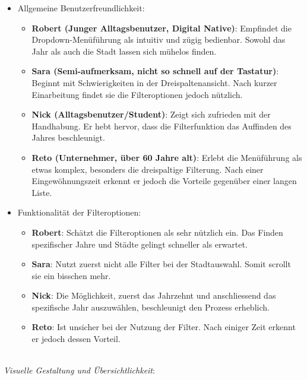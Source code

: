 \begin{itemize}
    \item Allgemeine Benutzerfreundlichkeit: 
    \begin{itemize}
        \item \textbf{Robert (Junger Alltagsbenutzer, Digital Native)}: 
              Empfindet die Drop\-down-Menü\-führung als intuitiv und zügig bedienbar. 
              Sowohl das Jahr als auch die Stadt lassen sich mühelos finden. 
        \item \textbf{Sara (Semi-aufmerksam, nicht so schnell auf der Tastatur)}: 
              Beginnt mit Schwierigkeiten in der Dreispaltenansicht. 
              Nach kurzer Einarbeitung findet sie die Filteroptionen jedoch nützlich. 
        \item \textbf{Nick (Alltagsbenutzer/Student)}: 
              Zeigt sich zufrieden mit der Handhabung. 
              Er hebt hervor, dass die Filterfunktion das Auffinden des Jahres beschleunigt. 
        \item \textbf{Reto (Unternehmer, über 60 Jahre alt)}: 
              Erlebt die Menüführung als etwas komplex, besonders die dreispaltige Filterung. 
              Nach einer Eingewöhnungszeit erkennt er jedoch die Vorteile gegenüber einer langen Liste. 
    \end{itemize}
    \item Funktionalität der Filteroptionen: 
    \begin{itemize}
        \item \textbf{Robert}: 
              Schätzt die Filteroptionen als sehr nützlich ein. 
              Das Finden spezifischer Jahre und Städte gelingt schneller als erwartet. 
        \item \textbf{Sara}: 
              Nutzt zuerst nicht alle Filter bei der Stadtauswahl. 
              Somit scrollt sie ein bisschen mehr. 
        \item \textbf{Nick}: 
              Die Möglichkeit, zuerst das Jahrzehnt und anschliessend das spezifische Jahr auszuwählen, beschleunigt den Prozess erheblich. 
        \item \textbf{Reto}: 
              Ist unsicher bei der Nutzung der Filter. 
              Nach einiger Zeit erkennt er jedoch dessen Vorteil. 
    \end{itemize}
\end{itemize}

 \\
\emph{Visuelle Gestaltung und Übersichtlichkeit}: 

